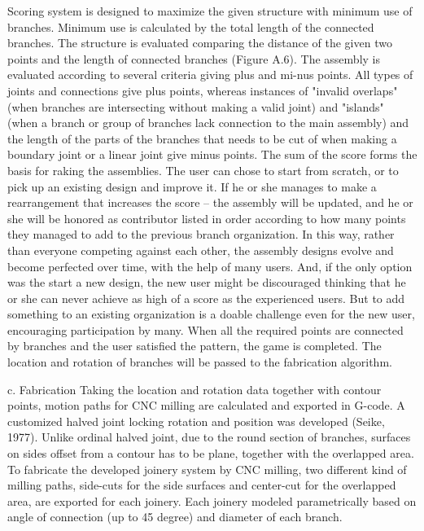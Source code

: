 		Scoring system is designed to maximize the given structure with minimum use of branches. Minimum use is calculated by the total length of the connected branches. The structure is evaluated comparing the distance of the given two points and the length of connected branches (Figure A.6). 
	The assembly is evaluated according to several criteria giving plus and mi-nus points. All types of joints and connections give plus points, whereas instances of "invalid overlaps" (when branches are intersecting without making a valid joint) and "islands" (when a branch or group of branches lack connection to the main assembly) and the length of the parts of the branches that needs to be cut of when making a boundary joint or a linear joint give minus points. The sum of the score forms the basis for raking the assemblies. 
		The user can chose to start from scratch, or to pick up an existing design and improve it. If he or she manages to make a rearrangement that increases the score – the assembly will be updated, and he or she will be honored as contributor listed in order according to how many points they managed to add to the previous branch organization. In this way, rather than everyone competing against each other, the assembly designs evolve and become perfected over time, with the help of many users. And, if the only option was the start a new design, the new user might be discouraged thinking that he or she can never achieve as high of a score as the experienced users. But to add something to an existing organization is a doable challenge even for the new user, encouraging participation by many.
	When all the required points are connected by branches and the user satisfied the pattern, the game is completed. The location and rotation of branches will be passed to the fabrication algorithm.




c. Fabrication
Taking the location and rotation data together with contour points, motion paths for CNC milling are calculated and exported in G-code. A customized halved joint locking rotation and position was developed (Seike, 1977). Unlike ordinal halved joint, due to the round section of branches, surfaces on sides offset from a contour has to be plane, together with the overlapped area. To fabricate the developed joinery system by CNC milling, two different kind of milling paths, side-cuts for the side surfaces and center-cut for the overlapped area, are exported for each joinery. Each joinery modeled parametrically based on angle of connection (up to 45 degree) and diameter of each branch.  